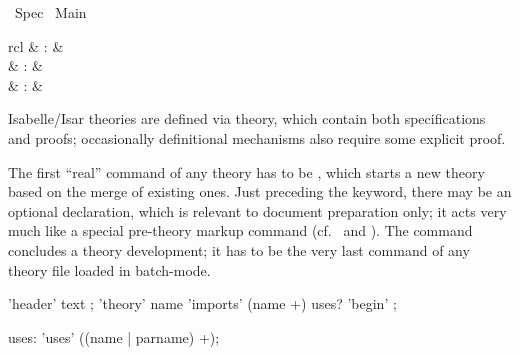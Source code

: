 %
\begin{isabellebody}%
\def\isabellecontext{Spec}%
%
\isadelimtheory
\isanewline
\isanewline
%
\endisadelimtheory
%
\isatagtheory
{}\isamarkupfalse%
\ Spec\isanewline
{}\ Main\isanewline
{}%
\endisatagtheory
{\isafoldtheory}%
%
\isadelimtheory
%
\endisadelimtheory
%
\isamarkuptrue%
%
\isamarkuptrue%
%
\begin{isamarkuptext}%
\begin{matharray}{rcl}
    \hypertarget{command.header}{\hyperlink{command.header}{\mbox{}}} & : &  \\
    \hypertarget{command.theory}{\hyperlink{command.theory}{\mbox{}}} & : &  \\
    \hypertarget{command.end}{\hyperlink{command.end}{\mbox{}}} & : &  \\
  \end{matharray}

  Isabelle/Isar theories are defined via theory, which contain both
  specifications and proofs; occasionally definitional mechanisms also
  require some explicit proof.

  The first ``real'' command of any theory has to be \hyperlink{command.theory}{\mbox{}}, which starts a new theory based on the merge of existing
  ones.  Just preceding the \hyperlink{command.theory}{\mbox{}} keyword, there may be
  an optional \hyperlink{command.header}{\mbox{}} declaration, which is relevant to
  document preparation only; it acts very much like a special
  pre-theory markup command (cf.\  and
  ).  The \hyperlink{command.end}{\mbox{}} command concludes a
  theory development; it has to be the very last command of any theory
  file loaded in batch-mode.

  \begin{rail}
    'header' text
    ;
    'theory' name 'imports' (name +) uses? 'begin'
    ;

    uses: 'uses' ((name | parname) +);
  \end{rail}

  \begin{descr}


\end{descr}
\end{isamarkuptext}
\end{isabellebody}
